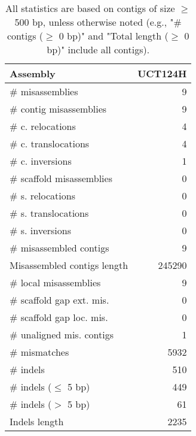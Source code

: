 \documentclass[12pt,a4paper]{article}
\begin{document}
\begin{table}[ht]
\begin{center}
\caption{All statistics are based on contigs of size $\geq$ 500 bp, unless otherwise noted (e.g., "\# contigs ($\geq$ 0 bp)" and "Total length ($\geq$ 0 bp)" include all contigs).}
\begin{tabular}{|l*{1}{|r}|}
\hline
Assembly & UCT124H \\ \hline
\# misassemblies & 9 \\ \hline
\hspace{2mm}\# contig misassemblies & 9 \\ \hline
\hspace{5mm}\# c. relocations & 4 \\ \hline
\hspace{5mm}\# c. translocations & 4 \\ \hline
\hspace{5mm}\# c. inversions & 1 \\ \hline
\hspace{2mm}\# scaffold misassemblies & 0 \\ \hline
\hspace{5mm}\# s. relocations & 0 \\ \hline
\hspace{5mm}\# s. translocations & 0 \\ \hline
\hspace{5mm}\# s. inversions & 0 \\ \hline
\# misassembled contigs & 9 \\ \hline
Misassembled contigs length & 245290 \\ \hline
\# local misassemblies & 9 \\ \hline
\# scaffold gap ext. mis. & 0 \\ \hline
\# scaffold gap loc. mis. & 0 \\ \hline
\# unaligned mis. contigs & 1 \\ \hline
\# mismatches & 5932 \\ \hline
\# indels & 510 \\ \hline
\hspace{5mm}\# indels ($\leq$ 5 bp) & 449 \\ \hline
\hspace{5mm}\# indels ($>$ 5 bp) & 61 \\ \hline
Indels length & 2235 \\ \hline
\end{tabular}
\end{center}
\end{table}
\end{document}
